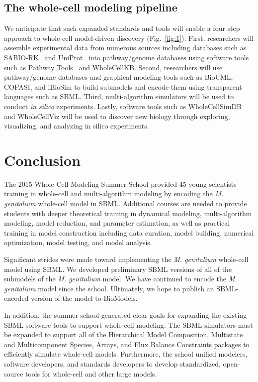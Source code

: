 \documentclass[journal,transmag]{IEEEtran}
\begin{document}
\subsection{The whole-cell modeling pipeline}
We anticipate that such expanded standards and tools will enable a four step approach to whole-cell model-driven discovery (Fig.~\ref{fig:1}). First, researchers will assemble experimental data from numerous sources including databases such as SABIO-RK~\cite{Wittig2012} and UniProt~\cite{UniProt2015} into pathway/genome databases using software tools such as Pathway Tools~\cite{Karp2010} and WholeCellKB. Second, researchers will use pathway/genome databases and graphical modeling tools such as BioUML, COPASI, and iBioSim to build submodels and encode them using transparent languages such as SBML. Third, multi-algorithm simulators will be used to conduct \textit{in silico} experiments. Lastly, software tools such as WholeCellSimDB and WholeCellViz will be used to discover new biology through exploring, visualizing, and analyzing in silico experiments.

\section{Conclusion}
The 2015 Whole-Cell Modeling Summer School provided 45 young scientists training in whole-cell and multi-algorithm modeling by encoding the \textit{M. genitalium} whole-cell model in SBML. Additional courses are needed to provide students with deeper theoretical training in dynamical modeling, multi-algorithm modeling, model reduction, and parameter estimation, as well as practical training in model construction including data curation, model building, numerical optimization, model testing, and model analysis.

Significant strides were made toward implementing the \textit{M. genitalium} whole-cell model using SBML. 
We developed preliminary SBML versions of all of the submodels of the \textit{M. genitalium} model. We have continued to encode the \textit{M. genitalium} model since the school. Ultimately, we hope to publish an SBML-encoded version of the model to BioModels. 

In addition, the summer school generated clear goals for expanding the existing SBML software tools to support whole-cell modeling. The SBML simulators must be expanded to support all of the Hierarchical Model Composition, Multistate and Multicomponent Species, Arrays, and Flux Balance Constraints packages to efficiently simulate whole-cell models. Furthermore, the school unified modelers, software developers, and standards developers to develop standardized, open-source tools for whole-cell and other large models.
\end{document}
